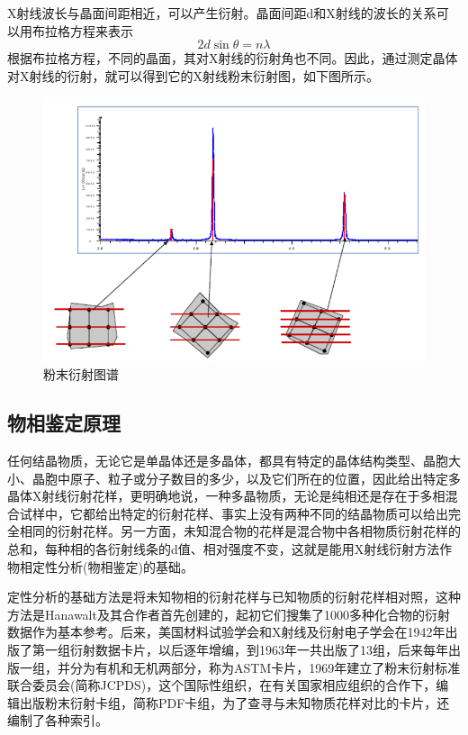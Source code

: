 \documentclass[a4paper]{article}
\begin{document}
X射线波长与晶面间距相近，可以产生衍射。晶面间距d和X射线的波长的关系可以用布拉格方程来表示
\begin{equation}\label{key}
2d\sin\theta = n\lambda
\end{equation}
根据布拉格方程，不同的晶面，其对X射线的衍射角也不同。因此，通过测定晶体对X射线的衍射，就可以得到它的X射线粉末衍射图，如下图所示。
\begin{figure}[H]
	\centering
	\includegraphics[width=0.85\linewidth]{fig/XRD.jpg}
	\caption{粉末衍射图谱}
\end{figure}

\subsection{物相鉴定原理}

任何结晶物质，无论它是单晶体还是多晶体，都具有特定的晶体结构类型、晶胞大小、晶胞中原子、粒子或分子数目的多少，以及它们所在的位置，因此给出特定多晶体X射线衍射花样，更明确地说，一种多晶物质，无论是纯相还是存在于多相混合试样中，它都给出特定的衍射花样、事实上没有两种不同的结晶物质可以给出完全相同的衍射花样。另一方面，未知混合物的花样是混合物中各相物质衍射花样的总和，每种相的各衍射线条的d值、相对强度不变，这就是能用X射线衍射方法作物相定性分析(物相鉴定)的基础。

定性分析的基础方法是将未知物相的衍射花样与已知物质的衍射花样相对照，这种方法是Hanawalt及其合作者首先创建的，起初它们搜集了1000多种化合物的衍射数据作为基本参考。后来，美国材料试验学会和X射线及衍射电子学会在1942年出版了第一组衍射数据卡片，以后逐年增编，到1963年一共出版了13组，后来每年出版一组，并分为有机和无机两部分，称为ASTM卡片，1969年建立了粉末衍射标准联合委员会(简称JCPDS)，这个国际性组织，在有关国家相应组织的合作下，编辑出版粉末衍射卡组，简称PDF卡组，为了查寻与未知物质花样对比的卡片，还编制了各种索引。
\end{document}
